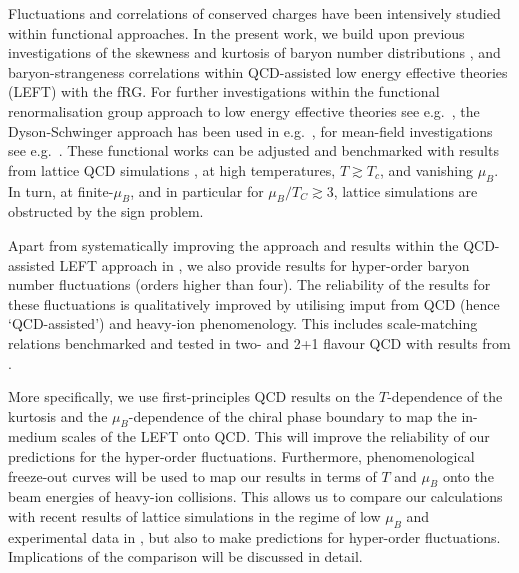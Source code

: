 \documentclass[%
reprint,
superscriptaddress,
showpacs,preprintnumbers,
amsmath,amssymb,
aps,
prd,
]{revtex4-1}
\begin{document}
Fluctuations and correlations of conserved charges have been intensively studied within functional approaches. In the present work, we build upon previous investigations  of the skewness and kurtosis of baryon number distributions \cite{Fu:2015naa,Fu:2015amv,Fu:2016tey}, and baryon-strangeness correlations \cite{Fu:2018qsk,Fu:2018swz} within QCD-assisted low energy effective theories (LEFT) with the fRG. For further  investigations within the functional renormalisation group approach to low energy effective theories see e.g.\  \cite{Skokov:2010wb,Skokov:2010uh,Morita:2014fda,Almasi:2017bhq}, the Dyson-Schwinger approach has been used in e.g.\  \cite{Xin:2014ela,Isserstedt:2019pgx}, for mean-field investigations see e.g.\ \cite{Fu:2009wy,Fu:2010ay,Karsch:2010hm,Schaefer:2011ex,Li:2018ygx}. These functional works can be adjusted and benchmarked with results from lattice QCD simulations  \cite{Bazavov:2012vg,Borsanyi:2013hza,Borsanyi:2014ewa,Bazavov:2017dus,Bazavov:2017tot,Borsanyi:2018grb,Bazavov:2020bjn}, at high temperatures, $T\gtrsim T_c$, and vanishing $\mu_B$. In turn, at finite-$\mu_B$, and in particular for $\mu_B/T_C\gtrsim 3$, lattice simulations are obstructed by the sign problem. 
	
Apart from systematically improving the approach and results within the QCD-assisted LEFT approach in  \cite{Fu:2015naa,Fu:2015amv,Fu:2016tey}, we also provide results for  hyper-order baryon number fluctuations (orders higher than four). The reliability of the results for these fluctuations is qualitatively improved by utilising imput from QCD (hence  `QCD-assisted') and heavy-ion phenomenology. This includes scale-matching relations benchmarked and tested in two- and 2+1 flavour QCD with results from \cite{Fu:2019hdw} . 
	
	
More specifically, we use first-principles QCD results on the $T$-dependence of the kurtosis and the $\mu_B$-dependence of the chiral phase boundary to map the in-medium scales of the LEFT onto QCD. This will improve the reliability of our predictions for the hyper-order fluctuations. Furthermore, phenomenological freeze-out curves will be used to map our results in terms of $T$ and $\mu_B$ onto the beam energies of heavy-ion collisions. This allows us to compare our calculations with recent results of lattice simulations in the regime of low $\mu_B$ and experimental data in \cite{Adam:2020unf, Nonaka:2020crv, Pandav:2020uzx}, but also to make predictions for hyper-order fluctuations. Implications of the comparison will be discussed in detail.
	
\end{document}
